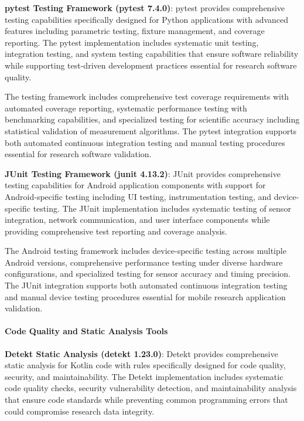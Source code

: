 \documentclass[12pt,a4paper]{article}
\begin{document}
\textbf{pytest Testing Framework (pytest 7.4.0)}: pytest provides comprehensive testing capabilities specifically designed
for Python applications with advanced features including parametric testing, fixture management, and coverage reporting.
The pytest implementation includes systematic unit testing, integration testing, and system testing capabilities that
ensure software reliability while supporting test-driven development practices essential for research software quality.

The testing framework includes comprehensive test coverage requirements with automated coverage reporting, systematic
performance testing with benchmarking capabilities, and specialized testing for scientific accuracy including
statistical validation of measurement algorithms. The pytest integration supports both automated continuous integration
testing and manual testing procedures essential for research software validation.

\textbf{JUnit Testing Framework (junit 4.13.2)}: JUnit provides comprehensive testing capabilities for Android application
components with support for Android-specific testing including UI testing, instrumentation testing, and device-specific
testing. The JUnit implementation includes systematic testing of sensor integration, network communication, and user
interface components while providing comprehensive test reporting and coverage analysis.

The Android testing framework includes device-specific testing across multiple Android versions, comprehensive
performance testing under diverse hardware configurations, and specialized testing for sensor accuracy and timing
precision. The JUnit integration supports both automated continuous integration testing and manual device testing
procedures essential for mobile research application validation.

\paragraph{Code Quality and Static Analysis Tools}

\textbf{Detekt Static Analysis (detekt 1.23.0)}: Detekt provides comprehensive static analysis for Kotlin code with rules
specifically designed for code quality, security, and maintainability. The Detekt implementation includes systematic
code quality checks, security vulnerability detection, and maintainability analysis that ensure code standards while
preventing common programming errors that could compromise research data integrity.
\end{document}
